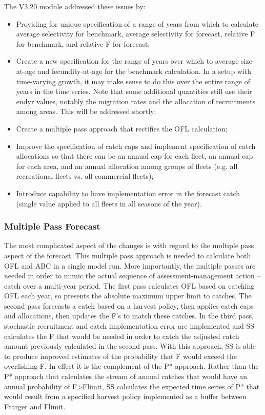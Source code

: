 The V3.20 module addressed these issues by:
\begin{itemize}
	\item Providing for unique specification of a range of years from which to calculate average selectivity for benchmark, average selectivity for forecast, relative F for benchmark, and relative F for forecast;
	\item Create a new specification for the range of years over which to average size-at-age and fecundity-at-age for the benchmark calculation.  In a setup with time-varying growth, it may make sense to do this over the entire range of years in the time series.  Note that some additional quantities still use their endyr values, notably the migration rates and the allocation of recruitments among areas.  This will be addressed shortly;
	\item Create a multiple pass approach that rectifies the OFL calculation;
	\item Improve the specification of catch caps and implement specification of catch allocations so that there can be an annual cap for each fleet, an annual cap for each area, and an annual allocation among groups of fleets (e.g. all recreational fleets vs. all commercial fleets);
	\item Introduce capability to have implementation error in the forecast catch (single value applied to all fleets in all seasons of the year).
\end{itemize}

\subsubsection{Multiple Pass Forecast}
The most complicated aspect of the changes is with regard to the multiple pass aspect of the forecast.  This multiple pass approach is needed to calculate both OFL and ABC in a single model run.  More importantly, the multiple passes are needed in order to mimic the actual sequence of assessment-management action – catch over a multi-year period.  The first pass calculates OFL based on catching OFL each year, so presents the absolute maximum upper limit to catches.  The second pass forecasts a catch based on a harvest policy, then applies catch caps and allocations, then updates the F’s to match these catches.  In the third pass, stochastic recruitment and catch implementation error are implemented and SS calculates the F that would be needed in order to catch the adjusted catch amount previously calculated in the second pass.  With this approach, SS is able to produce improved estimates of the probability that F would exceed the overfishing F.  In effect it is the complement of the P* approach.  Rather than the P* approach that calculates the stream of annual catches that would have an annual probability of F>Flimit, SS calculates the expected time series of P* that would result from a specified harvest policy implemented as a buffer between Ftarget and Flimit.

